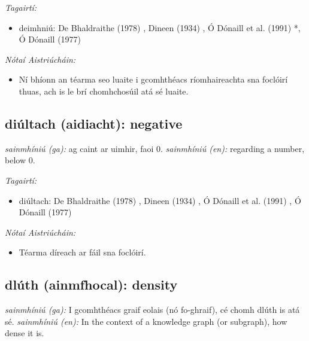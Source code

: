 \documentclass{article}
\begin{document}
 \noindent \textit{Tagairtí:}
\begin{itemize}
	\item deimhniú: De Bhaldraithe (1978) \cite{de-bhaldraithe}, Dineen (1934) \cite{dineen}, Ó Dónaill et al. (1991) \cite{focloir-beag}*, Ó Dónaill (1977) \cite{odonaill}
\end{itemize}

 \noindent \textit{Nótaí Aistriúcháin:}
\begin{itemize}
	\item Ní bhíonn an téarma seo luaite i gcomhthéacs ríomhaireachta sna foclóirí thuas, ach is le brí chomhchosúil atá sé luaite.
\end{itemize}


\subsection*{diúltach (aidiacht): negative} 
 \noindent \textit{sainmhíniú (ga):} ag caint ar uimhir, faoi 0.
\newline\newline
 \noindent \textit{sainmhíniú (en):} regarding a number, below 0.
\newline

 \noindent \textit{Tagairtí:}
\begin{itemize}
	\item diúltach: De Bhaldraithe (1978) \cite{de-bhaldraithe}, Dineen (1934) \cite{dineen}, Ó Dónaill et al. (1991) \cite{focloir-beag}, Ó Dónaill (1977) \cite{odonaill}
\end{itemize}

 \noindent \textit{Nótaí Aistriúcháin:}
\begin{itemize}
	\item Téarma díreach ar fáil sna foclóirí.
\end{itemize}


\subsection*{dlúth (ainmfhocal): density} 
 \noindent \textit{sainmhíniú (ga):} I gcomhthéacs graif eolais (nó fo-ghraif), cé chomh dlúth is atá sé.
\newline\newline
 \noindent \textit{sainmhíniú (en):} In the context of a knowledge graph (or subgraph), how dense it is.
\newline
\end{document}
